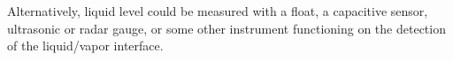 \vskip 10pt

Alternatively, liquid level could be measured with a float, a capacitive sensor, ultrasonic or radar gauge, or some other instrument functioning on the detection of the liquid/vapor interface.











